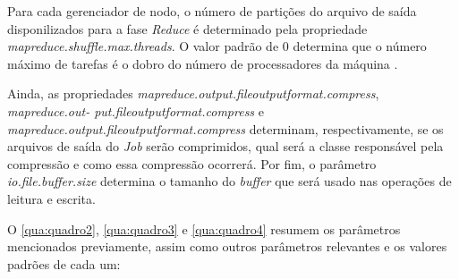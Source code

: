Para cada gerenciador de nodo, o número de partições do arquivo de saída disponilizados para a fase \textit{Reduce} é determinado pela propriedade \textit{mapreduce.shuffle.max.threads}. O valor padrão de 0 determina que o número máximo de tarefas é o dobro do número de processadores da máquina \cite{ProHadoop09}.

Ainda, as propriedades \textit{mapreduce.output.fileoutputformat.compress}, \textit{mapreduce.out- put.fileoutputformat.compress} e \textit{mapreduce.output.fileoutputformat.compress} determinam, respectivamente, se os arquivos de saída do \textit{Job} serão comprimidos, qual será a classe responsável pela compressão e como essa compressão ocorrerá. Por fim, o parâmetro \textit{io.file.buffer.size} determina o tamanho do \textit{\gls{buffer}} que será usado nas operações de leitura e escrita.

O \autoref{qua:quadro2}, \autoref{qua:quadro3} e \autoref{qua:quadro4} resumem os parâmetros mencionados previamente, assim como outros parâmetros relevantes e os valores padrões de cada um:


